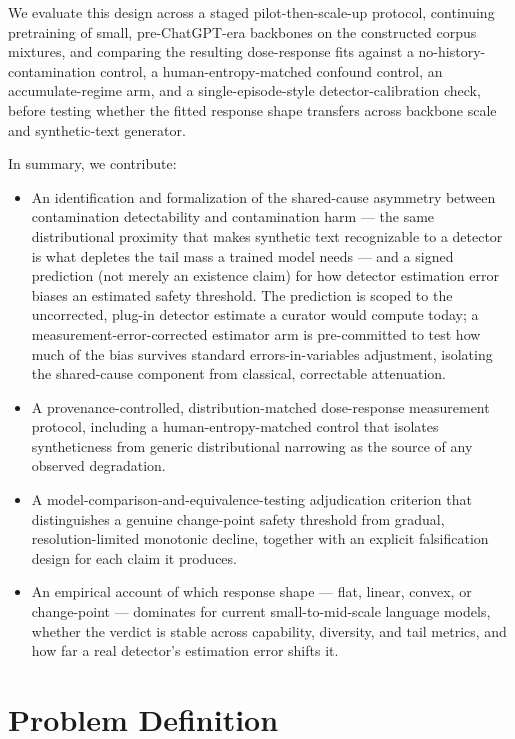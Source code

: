 \documentclass[11pt]{article}
\begin{document}
We evaluate this design across a staged pilot-then-scale-up protocol, continuing pretraining of small, pre-ChatGPT-era backbones on the constructed corpus mixtures, and comparing the resulting dose-response fits against a no-history-contamination control, a human-entropy-matched confound control, an accumulate-regime arm, and a single-episode-style detector-calibration check, before testing whether the fitted response shape transfers across backbone scale and synthetic-text generator.

In summary, we contribute:
\begin{itemize}[leftmargin=1.4em]
\item An identification and formalization of the shared-cause asymmetry between contamination detectability and contamination harm --- the same distributional proximity that makes synthetic text recognizable to a detector is what depletes the tail mass a trained model needs --- and a signed prediction (not merely an existence claim) for how detector estimation error biases an estimated safety threshold. The prediction is scoped to the uncorrected, plug-in detector estimate a curator would compute today; a measurement-error-corrected estimator arm is pre-committed to test how much of the bias survives standard errors-in-variables adjustment, isolating the shared-cause component from classical, correctable attenuation.
\item A provenance-controlled, distribution-matched dose-response measurement protocol, including a human-entropy-matched control that isolates syntheticness from generic distributional narrowing as the source of any observed degradation.
\item A model-comparison-and-equivalence-testing adjudication criterion that distinguishes a genuine change-point safety threshold from gradual, resolution-limited monotonic decline, together with an explicit falsification design for each claim it produces.
\item An empirical account of which response shape --- flat, linear, convex, or change-point --- dominates for current small-to-mid-scale language models, whether the verdict is stable across capability, diversity, and tail metrics, and how far a real detector's estimation error shifts it.
\end{itemize}

\section{Problem Definition}
\end{document}
